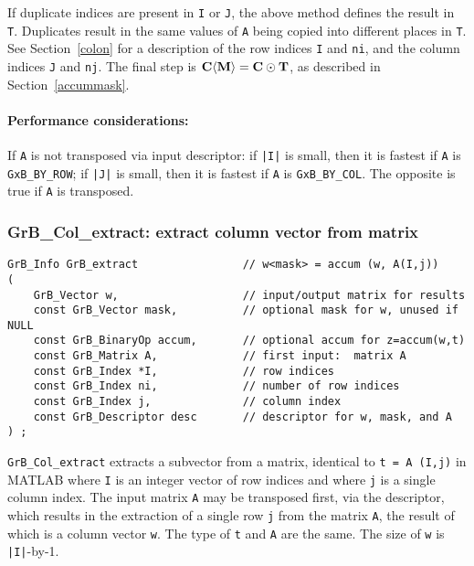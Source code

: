 \documentclass[12pt]{article}
\begin{document}
\vspace{-0.1in}
If duplicate indices are present in \verb'I' or \verb'J', the above method
defines the result in \verb'T'.  Duplicates result in the same values of
\verb'A' being copied into different places in \verb'T'.
See Section~\ref{colon} for a description of the row indices
\verb'I' and \verb'ni', and the column indices
\verb'J' and \verb'nj'.
The final step is ${\bf C \langle M \rangle  = C \odot
T}$, as described in Section~\ref{accummask}.

\paragraph{\bf Performance considerations:} %
If \verb'A' is not transposed via input descriptor: if \verb'|I|' is small,
then it is fastest if \verb'A' is \verb'GxB_BY_ROW'; if
\verb'|J|' is small, then it is fastest if \verb'A' is
\verb'GxB_BY_COL'.  The opposite is true if \verb'A' is transposed.

\newpage
\subsubsection{{\sf GrB\_Col\_extract:} extract column vector from matrix}
\label{extract_column}

\begin{mdframed}[userdefinedwidth=6in]
{\footnotesize
\begin{verbatim}
GrB_Info GrB_extract                // w<mask> = accum (w, A(I,j))
(
    GrB_Vector w,                   // input/output matrix for results
    const GrB_Vector mask,          // optional mask for w, unused if NULL
    const GrB_BinaryOp accum,       // optional accum for z=accum(w,t)
    const GrB_Matrix A,             // first input:  matrix A
    const GrB_Index *I,             // row indices
    const GrB_Index ni,             // number of row indices
    const GrB_Index j,              // column index
    const GrB_Descriptor desc       // descriptor for w, mask, and A
) ;
\end{verbatim} } \end{mdframed}

\verb'GrB_Col_extract' extracts a subvector from a matrix, identical to
\verb't = A (I,j)' in MATLAB where \verb'I' is an integer vector of row indices
and where \verb'j' is a single column index.  The input matrix \verb'A' may be
transposed first, via the descriptor, which results in the extraction of a
single row \verb'j' from the matrix \verb'A', the result of which is a column
vector \verb'w'.  The type of \verb't' and \verb'A' are the same.
The size of \verb'w' is \verb'|I|'-by-1.
\end{document}
